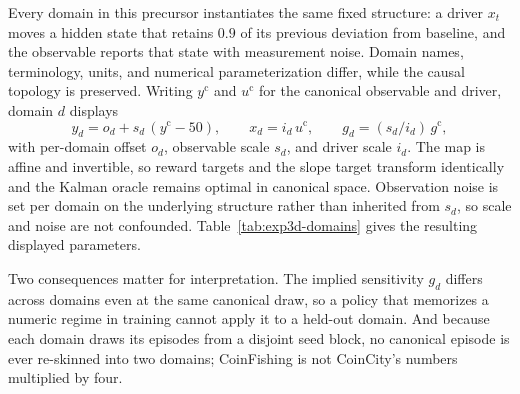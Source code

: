 Every domain in this precursor instantiates the same fixed structure: a driver
$x_t$ moves a hidden state that retains $0.9$ of its previous deviation from
baseline, and the observable reports that state with measurement noise. Domain
names, terminology, units, and numerical parameterization differ, while the causal
topology is preserved. Writing $y^{\mathrm{c}}$ and $u^{\mathrm{c}}$ for the
canonical observable and driver, domain $d$ displays
\begin{equation}
  y_d = o_d + s_d\,(y^{\mathrm{c}} - 50), \qquad x_d = i_d\,u^{\mathrm{c}},
  \qquad g_d = (s_d / i_d)\, g^{\mathrm{c}},
  \label{eq:exp3d-skin}
\end{equation}
with per-domain offset $o_d$, observable scale $s_d$, and driver scale $i_d$. The
map is affine and invertible, so reward targets and the slope target transform
identically and the Kalman oracle remains optimal in canonical space. Observation
noise is set per domain on the underlying structure rather than inherited from
$s_d$, so scale and noise are not confounded. Table~\ref{tab:exp3d-domains} gives
the resulting displayed parameters.

\begin{center}
\begin{minipage}{\linewidth}
\centering
{}
\label{tab:exp3d-domains}
\scriptsize
\resizebox{\linewidth}{!}{}
\end{minipage}
\end{center}

Two consequences matter for interpretation. The implied sensitivity $g_d$ differs
across domains even at the same canonical draw, so a policy that memorizes a
numeric regime in training cannot apply it to a held-out domain. And because each
domain draws its episodes from a disjoint seed block, no canonical episode is ever
re-skinned into two domains; CoinFishing is not CoinCity's numbers multiplied by
four.

